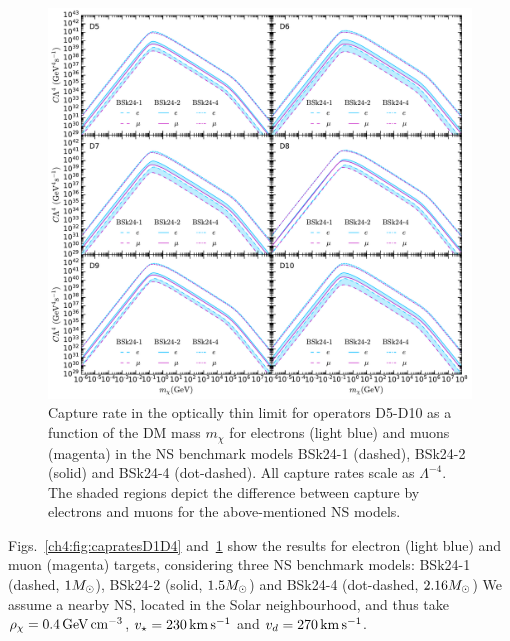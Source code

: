      \begin{figure}[t!bp] 
    \centering
    \includegraphics[width=\textwidth]{capture_2/D5_D10_C_mDM_lept.pdf}
    \caption[Capture rate in the optically thin limit for operators D5-D10 as a function of the DM mass $m_\chi$ for electrons (light blue) and muons (magenta) in the NS benchmark models BSk24-1 (dashed), BSk24-2 (solid) and BSk24-4 (dot-dashed).]{Capture rate in the optically thin limit for operators D5-D10 as a function of the DM mass $m_\chi$ for electrons (light blue) and muons (magenta) in the NS benchmark models BSk24-1 (dashed), BSk24-2 (solid) and BSk24-4 (dot-dashed). All capture rates scale as $\Lambda^{-4}$. The shaded regions depict the difference between capture by electrons and muons for the above-mentioned NS models. 
    }
    \label{ch4:fig:capratesD5D10}
    \end{figure}

    

Figs.~\ref{ch4:fig:capratesD1D4} and~\ref{ch4:fig:capratesD5D10} show the results for electron (light blue) and muon (magenta) targets, considering three NS benchmark models: BSk24-1 (dashed, $1M_\odot$), BSk24-2 (solid, $1.5M_\odot$) and BSk24-4 (dot-dashed, $2.16M_\odot$) We assume a nearby NS, located in the Solar neighbourhood, and thus take $\rho_\chi=0.4{\rm \,GeV}{\rm \,cm}^{-3}$, $v_\star=230{\rm \,km}{\rm \,s}^{-1}$ and $v_d=270{\rm \,km}{\rm \,s}^{-1}$.  

